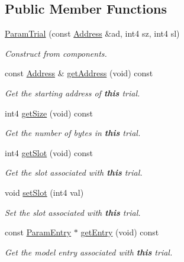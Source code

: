 \subsection*{Public Member Functions}
\begin{DoxyCompactItemize}
\item 
\mbox{\hyperlink{class_param_trial_ac5046f61b5daca7e64e282d2552ba5c8}{Param\+Trial}} (const \mbox{\hyperlink{class_address}{Address}} \&ad, int4 sz, int4 sl)
\begin{DoxyCompactList}\small\item\em Construct from components. \end{DoxyCompactList}\item 
const \mbox{\hyperlink{class_address}{Address}} \& \mbox{\hyperlink{class_param_trial_aad40b54a44a9eae8890e6d6ebbb6d5bb}{get\+Address}} (void) const
\begin{DoxyCompactList}\small\item\em Get the starting address of {\bfseries{this}} trial. \end{DoxyCompactList}\item 
int4 \mbox{\hyperlink{class_param_trial_a92758568d74f243b6680258fa8cb440a}{get\+Size}} (void) const
\begin{DoxyCompactList}\small\item\em Get the number of bytes in {\bfseries{this}} trial. \end{DoxyCompactList}\item 
int4 \mbox{\hyperlink{class_param_trial_a54cb5c24617993dc4f2a6548059d2e10}{get\+Slot}} (void) const
\begin{DoxyCompactList}\small\item\em Get the {\itshape slot} associated with {\bfseries{this}} trial. \end{DoxyCompactList}\item 
void \mbox{\hyperlink{class_param_trial_a64a57d4768366a15b920f0670ad2e83d}{set\+Slot}} (int4 val)
\begin{DoxyCompactList}\small\item\em Set the {\itshape slot} associated with {\bfseries{this}} trial. \end{DoxyCompactList}\item 
const \mbox{\hyperlink{class_param_entry}{Param\+Entry}} $\ast$ \mbox{\hyperlink{class_param_trial_aa4c4b22cd813b218292b6bc7db4e00e1}{get\+Entry}} (void) const
\begin{DoxyCompactList}\small\item\em Get the model entry associated with {\bfseries{this}} trial. \end{DoxyCompactList}\item 

\end{DoxyCompactItemize}
